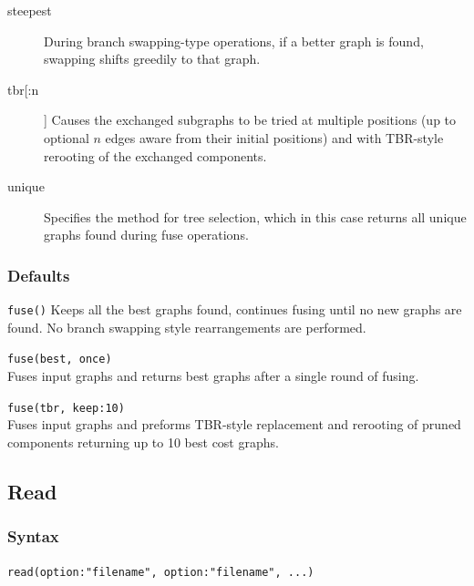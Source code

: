 \begin{description}
		\item [steepest] During branch swapping-type operations, if a better graph is found, swapping shifts greedily to
		that graph. 
		
		\item [tbr[:n]] Causes the exchanged subgraphs to be tried at multiple positions (up to optional 
		$n$ edges aware from their initial positions) and with TBR-style rerooting of the exchanged 
		components.
		
		\item [unique] Specifies the method for tree selection, which in this case returns all unique 
		graphs found during fuse operations.	
	\end{description}	
	
	\subsubsection{Defaults}
		\texttt{fuse()} Keeps all the best graphs found, continues fusing until no new graphs are found. 
		No branch swapping style rearrangements are performed.
	
	\begin{example}
	
		\item{\texttt{fuse(best, once)}\\Fuses input graphs and returns best graphs after a single round of 
		fusing.}
		
		\item{\texttt{fuse(tbr, keep:10)} \\Fuses input graphs and preforms TBR-style replacement and 
		rerooting of pruned components returning up to 10 best cost graphs.}
		
	\end{example}

\subsection{Read}
	\label{subsec:Read}
	\subsubsection{Syntax}
		\texttt{read(option:"filename", option:"filename", ...)}
			
